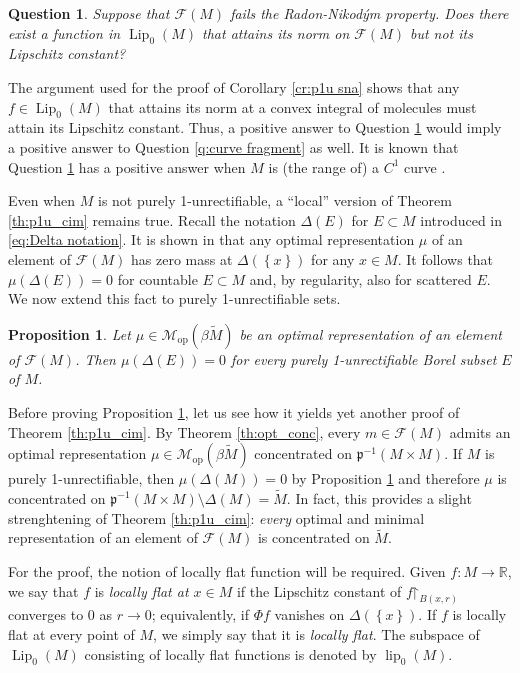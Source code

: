 \documentclass[a4paper,10pt]{amsart}
\DeclareMathOperator{\Lip}{Lip}                             %
\DeclareMathOperator{\lip}{lip}                             %
\newcommand{\RR}{\mathbb{R}}                                %
\newcommand{\set}[1]{\left\{{#1}\right\}}                   %
\newcommand{\restrict}{\mathord{\upharpoonright}}           %
\newcommand{\lipfree}[1]{\mathcal{F}({#1})}                 %
\newcommand{\wt}[1]{\widetilde{#1}}                         %
\newcommand{\bwt}[1]{\beta\wt{#1}}                          %
\newcommand{\pp}{\mathfrak{p}}                              %
\newcommand{\opr}[1]{\mathcal{M}_{\mathrm{op}}(#1)}         %
\theoremstyle{plain}
\newtheorem{proposition}[theorem]{Proposition}
\newtheorem{question}{Question}
\theoremstyle{definition}
\theoremstyle{remark}
\begin{document}
\begin{question}\label{q:sna}
Suppose that $\lipfree{M}$ fails the Radon-Nikod\'ym property. Does there exist a function in $\Lip_0(M)$ that attains its norm on $\lipfree{M}$ but not its Lipschitz constant?
\end{question}

The argument used for the proof of Corollary \ref{cr:p1u sna} shows that any $f\in\Lip_0(M)$ that attains its norm at a convex integral of molecules must attain its Lipschitz constant. Thus, a positive answer to Question \ref{q:sna} would imply a positive answer to Question \ref{q:curve fragment} as well. It is known that Question \ref{q:sna} has a positive answer when $M$ is (the range of) a $C^1$ curve \cite[Theorem 1.2]{Chiclana}.

\medskip

Even when $M$ is not purely 1-unrectifiable, a ``local'' version of Theorem \ref{th:p1u_cim} remains true. Recall the notation $\Delta(E)$ for $E\subset M$ introduced in \eqref{eq:Delta notation}. It is shown in \cite[Lemma 2.4]{APS1} that any optimal representation $\mu$ of an element of $\lipfree{M}$ has zero mass at $\Delta(\set{x})$ for any $x\in M$. It follows that $\mu(\Delta(E))=0$ for countable $E\subset M$ and, by regularity, also for scattered $E$. We now extend this fact to purely 1-unrectifiable sets.


\begin{proposition}\label{pr:diagonal_p1u}
Let $\mu\in\opr{\bwt{M}}$ be an optimal representation of an element of $\lipfree{M}$. Then $\mu(\Delta(E))=0$ for every purely 1-unrectifiable Borel subset $E$ of $M$.
\end{proposition}

Before proving Proposition \ref{pr:diagonal_p1u}, let us see how it yields yet another proof of Theorem \ref{th:p1u_cim}. By Theorem \ref{th:opt_conc}, every $m\in\lipfree{M}$ admits an optimal representation $\mu\in\opr{\bwt{M}}$ concentrated on $\pp^{-1}(M\times M)$. If $M$ is purely 1-unrectifiable, then $\mu(\Delta(M))=0$ by Proposition \ref{pr:diagonal_p1u} and therefore $\mu$ is concentrated on $\pp^{-1}(M\times M)\setminus\Delta(M)=\wt{M}$. In fact, this provides a slight strenghtening of Theorem \ref{th:p1u_cim}: \emph{every} optimal and minimal representation of an element of $\lipfree{M}$ is concentrated on $\wt{M}$.

For the proof, the notion of locally flat function will be required. Given $f:M\to\RR$, we say that $f$ is \emph{locally flat at $x\in M$} if the Lipschitz constant of $f\restrict_{B(x,r)}$ converges to $0$ as $r\to 0$; equivalently, if $\Phi f$ vanishes on $\Delta(\set{x})$. If $f$ is locally flat at every point of $M$, we simply say that it is \emph{locally flat}. The subspace of $\Lip_0(M)$ consisting of locally flat functions is denoted by $\lip_0(M)$.
\end{document}
